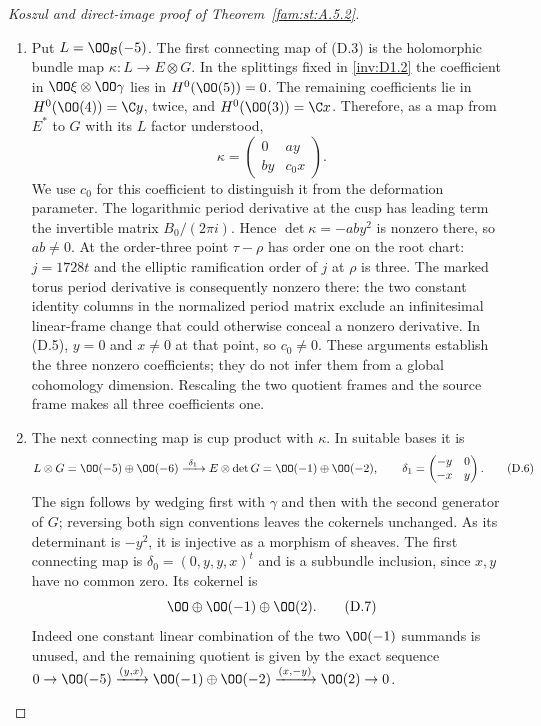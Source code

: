 \begin{proof}[Koszul and direct-image proof of Theorem~\ref{fam:st:A.5.2}]
\begin{enumerate}[label=\arabic*.,leftmargin=*]
\item Put $L=\OO_{\mathcal B}(-5)$. The first connecting map of (D.3) is
the holomorphic bundle map
$\kappa:L\to E\otimes G$. In the splittings fixed in \ref{inv:D1.2} the
coefficient in $\OO\xi\otimes\OO\gamma$ lies in $H^0(\OO(5))=0$.
The remaining coefficients lie in
$H^0(\OO(4))=\C y$, twice, and $H^0(\OO(3))=\C x$.
Therefore, as a map from $E^*$ to $G$ with its $L$ factor understood,
\[
 \kappa=\begin{pmatrix}0&a y\\ b y&c_0x\end{pmatrix}. \tag{D.5}
\]
We use $c_0$ for this coefficient to distinguish it from the deformation
parameter. The logarithmic period derivative at the cusp has leading
term the invertible matrix $B_0/(2\pi i)$. Hence
$\det\kappa=-ab y^2$ is nonzero there, so $ab\ne0$.
At the order-three point $\tau-\rho$ has order one on the root chart:
$j=1728t$ and the elliptic ramification order of $j$ at $\rho$ is
three. The marked torus period derivative is consequently nonzero
there: the two constant identity columns in the normalized period
matrix exclude an infinitesimal linear-frame change that could
otherwise conceal a nonzero derivative. In (D.5), $y=0$ and
$x\ne0$ at that point, so $c_0\ne0$.
These arguments establish the three nonzero coefficients; they do not
infer them from a global cohomology dimension. Rescaling the two
quotient frames and the source frame makes all three coefficients one.

\item The next connecting map is cup product with $\kappa$. In suitable
bases it is
\[
 L\otimes G=\OO(-5)\oplus\OO(-6)
 \xrightarrow{\ \delta_1\ }
 E\otimes\det G=\OO(-1)\oplus\OO(-2),\qquad
 \delta_1=\begin{pmatrix}-y&0\\-x&y\end{pmatrix}.       \tag{D.6}
\]
The sign follows by wedging first with $\gamma$ and then with the
second generator of $G$; reversing both sign conventions leaves the
cokernels unchanged. As its determinant is $-y^2$, it is injective as
a morphism of sheaves. The first connecting map is
$\delta_0=(0,y,y,x)^t$ and is a subbundle inclusion, since $x,y$ have
no common zero. Its cokernel is
\[
 \OO\oplus\OO(-1)\oplus\OO(2).                       \tag{D.7}
\]
Indeed one constant linear combination of the two $\OO(-1)$ summands
is unused, and the remaining quotient is given by the exact sequence
$0\to\OO(-5)\xrightarrow{(y,x)}\OO(-1)\oplus\OO(-2)
\xrightarrow{(x,-y)}\OO(2)\to0$.


\end{enumerate}
\end{proof}
